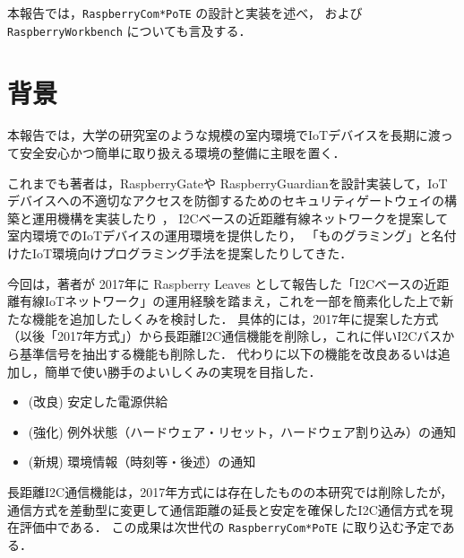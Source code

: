 本報告では，{\tt Raspberry\-Com*PoTE} の設計と実装を述べ，
および {\tt Raspberry\-Workbench} についても言及する．


\section{背景}
\label{sec:02background}

本報告では，大学の研究室のような規模の室内環境でIoTデバイスを長期に渡って安全安心かつ簡単に取り扱える環境の整備に主眼を置く．

これまでも著者は，RaspberryGateや RaspberryGuardianを設計実装して，IoTデバイスへの不適切なアクセスを防御するためのセキュリティゲートウェイの構築と運用機構を実装したり\cite{hohno:RaspberryGate}\cite{hohno:RaspberryGuardian} ，
I2Cベースの近距離有線ネットワークを提案して室内環境でのIoTデバイスの運用環境を提供したり\cite{hohno:I2CwiredLAN-2017}，
「ものグラミング」と名付けたIoT環境向けプログラミング手法を提案したりしてきた\cite{hohno:monogramming2}．

今回は，著者が 2017年に Raspberry Leaves として報告した「I2Cベースの近距離有線IoTネットワーク」の運用経験を踏まえ，これを一部を簡素化した上で新たな機能を追加したしくみを検討した．
具体的には，2017年に提案した方式（以後「2017年方式」）から長距離I2C通信機能を削除し，これに伴いI2Cバスから基準信号を抽出する機能も削除した．
代わりに以下の機能を改良あるいは追加し，簡単で使い勝手のよいしくみの実現を目指した．

\begin{itemize}
\item (改良) 安定した電源供給
\item (強化) 例外状態（ハードウェア・リセット，ハードウェア割り込み）の通知
\item (新規) 環境情報（時刻等・後述）の通知
\end{itemize}

長距離I2C通信機能は，2017年方式には存在したものの本研究では削除したが，通信方式を差動型に変更して通信距離の延長と安定を確保したI2C通信方式を現在評価中である．
この成果は次世代の {\tt Raspberry\-Com*PoTE} に取り込む予定である．

